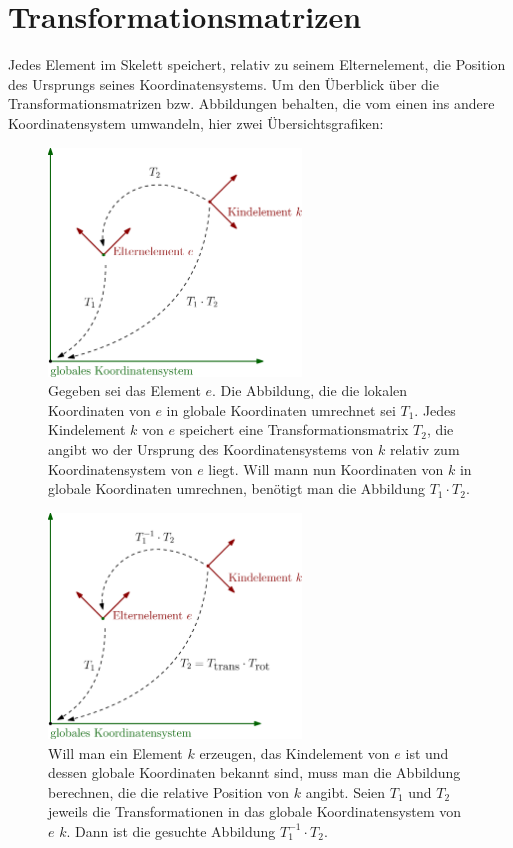 \section{Transformationsmatrizen}

Jedes Element im Skelett speichert, relativ zu seinem Elternelement, die Position des Ursprungs seines Koordinatensystems. Um den Überblick über die Transformationsmatrizen bzw. Abbildungen behalten, die vom einen ins andere Koordinatensystem umwandeln, hier zwei Übersichtsgrafiken:

\begin{figure}
 \centering
 \includegraphics[width=0.6\textwidth]{graphics/transformation_matrices.eps}
 \caption{Gegeben sei das Element $e$. Die Abbildung, die die lokalen Koordinaten von $e$ in globale Koordinaten umrechnet sei $T_1$.
 Jedes Kindelement $k$ von $e$ speichert eine Transformationsmatrix $T_2$, die angibt wo der Ursprung des Koordinatensystems von $k$ relativ zum Koordinatensystem von $e$ liegt. Will mann nun Koordinaten von $k$ in globale Koordinaten umrechnen, benötigt man die Abbildung $T_1 \cdot T_2$.}
\end{figure}

\begin{figure}
 \centering
 \includegraphics[width=0.6\textwidth]{graphics/transformation_matrices_spine.eps}
 \caption{Will man ein Element $k$ erzeugen, das Kindelement von $e$ ist und dessen globale Koordinaten bekannt sind, muss man die Abbildung berechnen, die die relative Position von $k$ angibt. Seien $T_1$ und $T_2$ jeweils die Transformationen in das globale Koordinatensystem von $e$ \bzw $k$. Dann ist die gesuchte Abbildung $T_1^{-1} \cdot T_2$.}
\end{figure}


